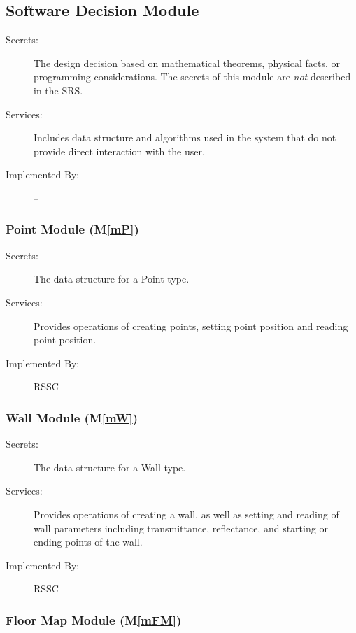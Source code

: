\documentclass[12pt, titlepage]{article}
\newcommand{\mref}[1]{M\ref{#1}}
\begin{document}
\subsection{Software Decision Module}

\begin{description}
\item[Secrets:] The design decision based on mathematical theorems, physical
  facts, or programming considerations. The secrets of this module are
  \emph{not} described in the SRS.
\item[Services:] Includes data structure and algorithms used in the system that
  do not provide direct interaction with the user. 
\item[Implemented By:] --
\end{description}

\subsubsection{Point Module (\mref{mP})}

\begin{description}
\item[Secrets:]The data structure for a Point type.
\item[Services:]Provides operations of creating points, setting point position and reading point position.
\item[Implemented By:] RSSC
\end{description}

\subsubsection{Wall Module (\mref{mW})}

\begin{description}
\item[Secrets:]The data structure for a Wall type.
\item[Services:]Provides operations of creating a wall, as well as setting and reading of wall parameters including transmittance, reflectance, and starting or ending points of the wall.
\item[Implemented By:] RSSC
\end{description}

\subsubsection{Floor Map Module (\mref{mFM})}
\end{document}

